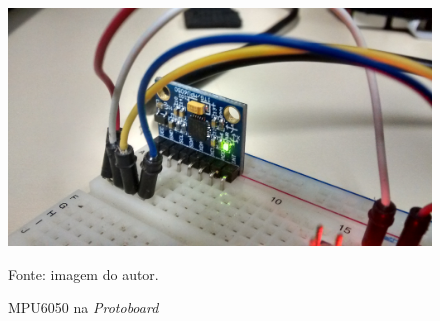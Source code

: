 	 	\begin{figure}[h]
	 		\centering
	 		\includegraphics[keepaspectratio=true,scale=0.15]{figuras/prototipo2.jpg}
	 		\caption{MPU6050 na \textit{Protoboard}}
	 		Fonte: imagem do autor. 
	 		\label{prototipo1_2}	
	 	\end{figure}
	 	
